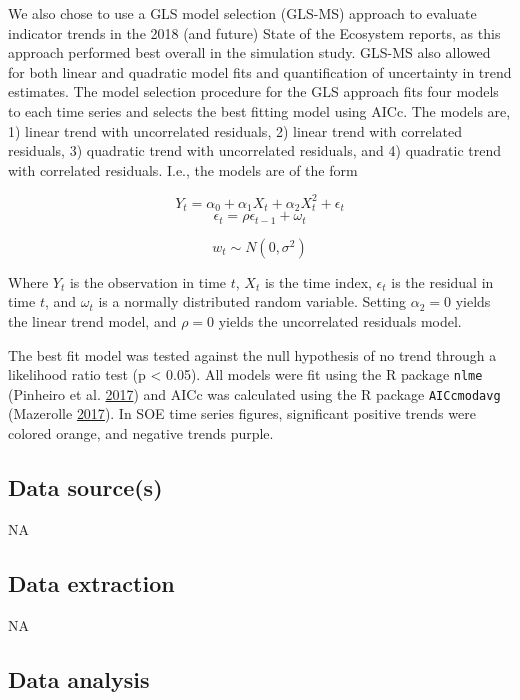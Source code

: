 \documentclass[
]{book}
\begin{document}
We also chose to use a GLS model selection (GLS-MS) approach to evaluate indicator trends in the 2018 (and future) State of the Ecosystem reports, as this approach performed best overall in the simulation study. GLS-MS also allowed for both linear and quadratic model fits and quantification of uncertainty in trend estimates. The model selection procedure for the GLS approach fits four models to each time series and selects the best fitting model using AICc. The models are, 1) linear trend with uncorrelated residuals, 2) linear trend with correlated residuals, 3) quadratic trend with uncorrelated residuals, and 4) quadratic trend with correlated residuals. I.e., the models are of the form

\[ Y_t = \alpha_0 + \alpha_1X_t + \alpha_2X_t^2 + \epsilon_t\]
\[\epsilon_t = \rho\epsilon_{t-1} + \omega_t\]

\[w_t \sim N(0, \sigma^2)\]

Where \(Y_t\) is the observation in time \(t\), \(X_t\) is the time index, \(\epsilon_t\) is the residual in time \(t\), and \(\omega_t\) is a normally distributed random variable. Setting \(\alpha_2 = 0\) yields the linear trend model, and \(\rho = 0\) yields the uncorrelated residuals model.

The best fit model was tested against the null hypothesis of no trend through a likelihood ratio test (p \textless{} 0.05). All models were fit using the R package \texttt{nlme} (Pinheiro et al. \protect\hyperlink{ref-Pinheiro2017}{2017}) and AICc was calculated using the R package \texttt{AICcmodavg} (Mazerolle \protect\hyperlink{ref-Mazerolle2017a}{2017}). In SOE time series figures, significant positive trends were colored orange, and negative trends purple.

\hypertarget{data-sources-43}{%
\subsection{Data source(s)}\label{data-sources-43}}

NA

\hypertarget{data-extraction-33}{%
\subsection{Data extraction}\label{data-extraction-33}}

NA

\hypertarget{data-analysis-41}{%
\subsection{Data analysis}\label{data-analysis-41}}
\end{document}
